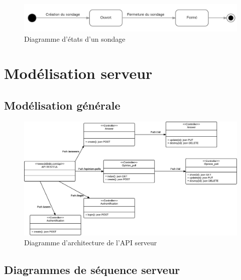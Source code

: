 \documentclass[titlepage]{report}
\begin{document}
\begin{figure}[h]
	\caption{Diagramme d'états d'un sondage}
	\label{annexe_diagramme_etat}
	\centering
	\includegraphics[width=\textwidth]{figures/diagrammes/etat.png}
\end{figure}

\clearpage

\chapter{Modélisation serveur}

\section{Modélisation générale}

\begin{figure}[h]
	\caption{Diagramme d'architecture de l'API serveur}
	\label{annexe_diagramme_architectureAPI}
	\centering
	\includegraphics[width=\textwidth]{figures/diagrammes/architectureAPI.png}
\end{figure}

\clearpage
\section{Diagrammes de séquence serveur}
\end{document}
